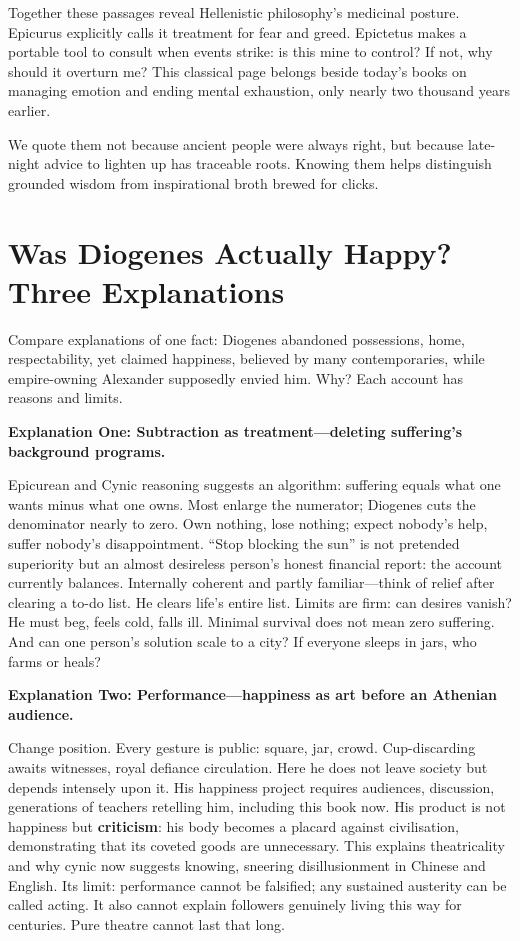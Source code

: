 Together these passages reveal Hellenistic philosophy's medicinal posture. Epicurus explicitly calls it treatment for fear and greed. Epictetus makes a portable tool to consult when events strike: is this mine to control? If not, why should it overturn me? This classical page belongs beside today's books on managing emotion and ending mental exhaustion, only nearly two thousand years earlier.

We quote them not because ancient people were always right, but because late-night advice to lighten up has traceable roots. Knowing them helps distinguish grounded wisdom from inspirational broth brewed for clicks.

\section[Was Diogenes Happy? Three Explanations]{Was Diogenes Actually Happy? Three Explanations}
Compare explanations of one fact: Diogenes abandoned possessions, home, respectability, yet claimed happiness, believed by many contemporaries, while empire-owning Alexander supposedly envied him. Why? Each account has reasons and limits.

\textbf{Explanation One: Subtraction as treatment---deleting suffering's background programs.}

Epicurean and Cynic reasoning suggests an algorithm: suffering equals what one wants minus what one owns. Most enlarge the numerator; Diogenes cuts the denominator nearly to zero. Own nothing, lose nothing; expect nobody's help, suffer nobody's disappointment. ``Stop blocking the sun'' is not pretended superiority but an almost desireless person's honest financial report: the account currently balances. Internally coherent and partly familiar---think of relief after clearing a to-do list. He clears life's entire list. Limits are firm: can desires vanish? He must beg, feels cold, falls ill. Minimal survival does not mean zero suffering. And can one person's solution scale to a city? If everyone sleeps in jars, who farms or heals?

\textbf{Explanation Two: Performance---happiness as art before an Athenian audience.}

Change position. Every gesture is public: square, jar, crowd. Cup-discarding awaits witnesses, royal defiance circulation. Here he does not leave society but depends intensely upon it. His happiness project requires audiences, discussion, generations of teachers retelling him, including this book now. His product is not happiness but \textbf{criticism}: his body becomes a placard against civilisation, demonstrating that its coveted goods are unnecessary. This explains theatricality and why cynic now suggests knowing, sneering disillusionment in Chinese and English. Its limit: performance cannot be falsified; any sustained austerity can be called acting. It also cannot explain followers genuinely living this way for centuries. Pure theatre cannot last that long.


